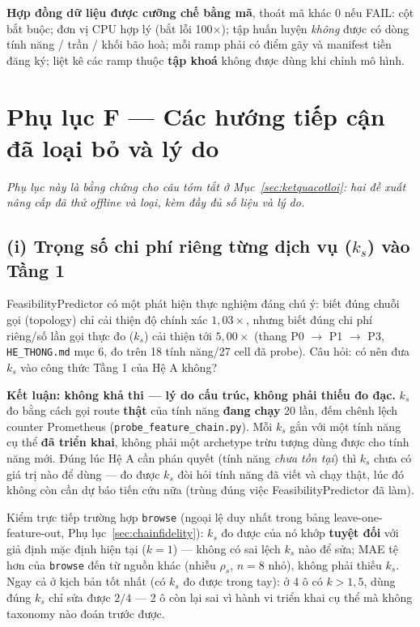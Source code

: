 \documentclass[11pt,a4paper]{article}
\begin{document}
\textbf{Hợp đồng dữ liệu được cưỡng chế bằng mã}, thoát mã khác 0 nếu FAIL: cột
bắt buộc; đơn vị CPU hợp lý (bắt lỗi 100$\times$); tập huấn luyện \emph{không}
được có dòng tính năng / trần / khối bão hoà; mỗi ramp phải có điểm gãy và
manifest tiền đăng ký; liệt kê các ramp thuộc \textbf{tập khoá} không được dùng
khi chỉnh mô hình.

\section{Phụ lục F --- Các hướng tiếp cận đã loại bỏ và lý do}\label{sec:phuluc-loaibo}
\emph{Phụ lục này là bằng chứng cho câu tóm tắt ở Mục~\ref{sec:ketquacotloi}:
hai đề xuất nâng cấp đã thử offline và loại, kèm đầy đủ số liệu và lý do.}

\subsection*{(i) Trọng số chi phí riêng từng dịch vụ ($k_s$) vào Tầng 1}
FeasibilityPredictor có một phát hiện thực nghiệm đáng chú ý: biết đúng chuỗi
gọi (topology) chỉ cải thiện độ chính xác $1{,}03\times$, nhưng biết đúng chi
phí riêng/số lần gọi thực đo ($k_s$) cải thiện tới $5{,}00\times$ (thang P0
$\to$ P1 $\to$ P3, \texttt{HE\_THONG.md} mục 6, đo trên 18 tính năng/27 cell đã
probe). Câu hỏi: có nên đưa $k_s$ vào công thức Tầng 1 của Hệ A không?

\textbf{Kết luận: không khả thi --- lý do cấu trúc, không phải thiếu đo đạc.}
$k_s$ đo bằng cách gọi route \textbf{thật} của tính năng \textbf{đang chạy} 20
lần, đếm chênh lệch counter Prometheus (\texttt{probe\_feature\_chain.py}). Mỗi
$k_s$ gắn với một tính năng cụ thể \textbf{đã triển khai}, không phải một
archetype trừu tượng dùng được cho tính năng mới. Đúng lúc Hệ A cần phán quyết
(tính năng \emph{chưa tồn tại}) thì $k_s$ chưa có giá trị nào để dùng --- đo
được $k_s$ đòi hỏi tính năng đã viết và chạy thật, lúc đó không còn cần dự báo
tiến cứu nữa (trùng đúng việc FeasibilityPredictor đã làm).

Kiểm trực tiếp trường hợp \texttt{browse} (ngoại lệ duy nhất trong bảng
leave-one-feature-out, Phụ lục~\ref{sec:chainfidelity}): $k_s$ đo được của nó
khớp \textbf{tuyệt đối} với giả định mặc định hiện tại ($k{=}1$) --- không có
sai lệch $k_s$ nào để sửa; MAE tệ hơn của \texttt{browse} đến từ nguồn khác
(nhiễu $\rho_s$, $n{=}8$ nhỏ), không phải thiếu $k_s$. Ngay cả ở kịch bản tốt
nhất (có $k_s$ đo được trong tay): ở 4 ô có $k{>}1{,}5$, dùng đúng $k_s$ chỉ
sửa được $2/4$ --- 2 ô còn lại sai vì hành vi triển khai cụ thể mà không
taxonomy nào đoán trước được.
\end{document}
